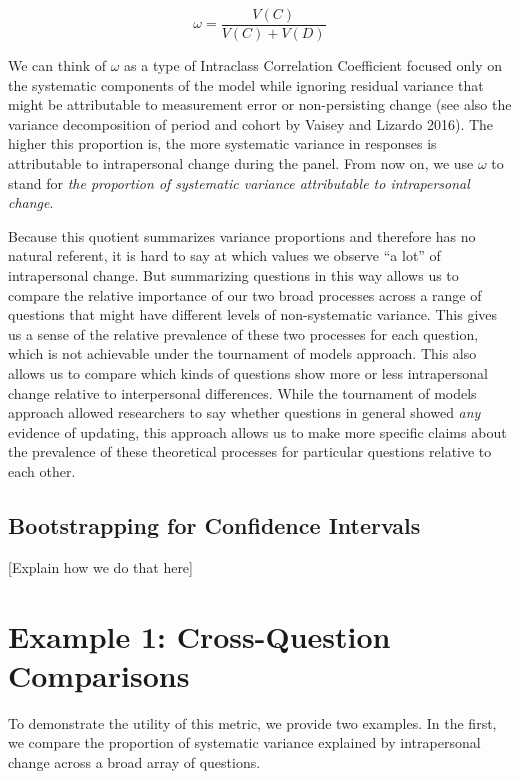 \documentclass[
  12pt,
]{article}
\begin{document}
\[
\omega = \frac{V(C)}{V(C) + V(D)}
\]

We can think of \(\omega\) as a type of Intraclass Correlation
Coefficient focused only on the systematic components of the model while
ignoring residual variance that might be attributable to measurement
error or non-persisting change (see also the variance decomposition of
period and cohort by Vaisey and Lizardo 2016). The higher this
proportion is, the more systematic variance in responses is attributable
to intrapersonal change during the panel. From now on, we use \(\omega\)
to stand for \emph{the proportion of systematic variance attributable to
intrapersonal change}.

Because this quotient summarizes variance proportions and therefore has
no natural referent, it is hard to say at which values we observe ``a
lot'' of intrapersonal change. But summarizing questions in this way
allows us to compare the relative importance of our two broad processes
across a range of questions that might have different levels of
non-systematic variance. This gives us a sense of the relative
prevalence of these two processes for each question, which is not
achievable under the tournament of models approach. This also allows us
to compare which kinds of questions show more or less intrapersonal
change relative to interpersonal differences. While the tournament of
models approach allowed researchers to say whether questions in general
showed \emph{any} evidence of updating, this approach allows us to make
more specific claims about the prevalence of these theoretical processes
for particular questions relative to each other.

\hypertarget{bootstrapping-for-confidence-intervals}{%
\subsection{Bootstrapping for Confidence
Intervals}\label{bootstrapping-for-confidence-intervals}}

{[}Explain how we do that here{]}

\hypertarget{example-1-cross-question-comparisons}{%
\section{Example 1: Cross-Question
Comparisons}\label{example-1-cross-question-comparisons}}

To demonstrate the utility of this metric, we provide two examples. In
the first, we compare the proportion of systematic variance explained by
intrapersonal change across a broad array of questions.
\end{document}
